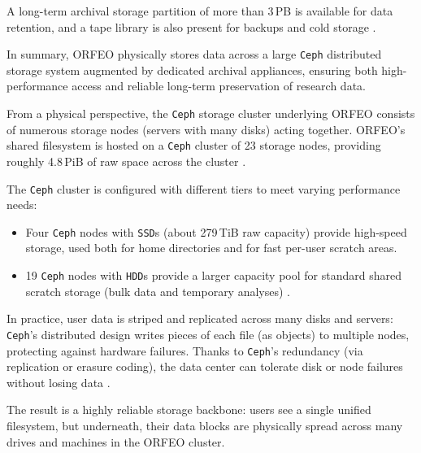 A long-term archival storage partition of more than 3\,PB is available for data 
retention, and a tape library is also present for backups and cold 
storage \parencite{ORFEO_Docs_Storage,orfeo-changelog-2024}. 

\medskip

In summary, ORFEO physically stores data across a large \texttt{Ceph} 
distributed storage system augmented by dedicated archival appliances, ensuring 
both high-performance access and reliable long-term preservation of research 
data.

\medskip

From a physical perspective, the \texttt{Ceph} storage cluster underlying ORFEO 
consists of numerous storage nodes (servers with many disks) acting together. 
ORFEO’s shared filesystem is hosted on a \texttt{Ceph} cluster of 23 storage 
nodes, providing roughly 4.8\,PiB of raw space across the 
cluster \parencite{ORFEO_Docs_Storage,orfeo-changelog-2024}. 

The \texttt{Ceph} cluster is configured with different tiers to meet varying 
performance needs:
\begin{itemize}
	\item Four \texttt{Ceph} nodes with \texttt{SSD}s (about 
	279\,TiB raw capacity) provide high-speed storage, used both for 
	home directories and for fast per-user scratch areas.  
	\item 19 \texttt{Ceph} nodes with \texttt{HDD}s provide a larger capacity 
	pool for standard shared scratch storage (bulk data and temporary analyses) 
	\parencite{ORFEO_Docs_Storage}.
\end{itemize}

In practice, user data is striped and replicated across many disks and servers: 
\texttt{Ceph}’s distributed design writes pieces of each file (as objects) to 
multiple nodes, protecting against hardware failures. Thanks to \texttt{Ceph}’s 
redundancy (via replication or erasure coding), the data center can tolerate 
disk or node failures without losing data \parencite{Ceph_RADOS,Ceph_Pools,Ceph_EC}. 

The result is a highly reliable storage backbone: users see a single unified 
filesystem, but underneath, their data blocks are physically spread across many 
drives and machines in the ORFEO cluster.

\medskip

